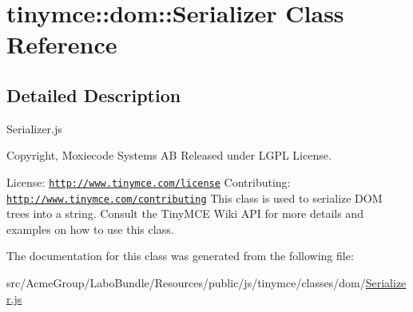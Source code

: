 \hypertarget{classtinymce_1_1dom_1_1_serializer}{\section{tinymce\+:\+:dom\+:\+:Serializer Class Reference}
\label{classtinymce_1_1dom_1_1_serializer}
}


\subsection{Detailed Description}
Serializer.\+js

Copyright, Moxiecode Systems A\+B Released under L\+G\+P\+L License.

License\+: \href{http://www.tinymce.com/license}{\tt http\+://www.\+tinymce.\+com/license} Contributing\+: \href{http://www.tinymce.com/contributing}{\tt http\+://www.\+tinymce.\+com/contributing} This class is used to serialize D\+O\+M trees into a string. Consult the Tiny\+M\+C\+E Wiki A\+P\+I for more details and examples on how to use this class. 

The documentation for this class was generated from the following file\+:\begin{DoxyCompactItemize}
\item 
src/\+Acme\+Group/\+Labo\+Bundle/\+Resources/public/js/tinymce/classes/dom/\hyperlink{dom_2_serializer_8js}{Serializer.\+js}\end{DoxyCompactItemize}
